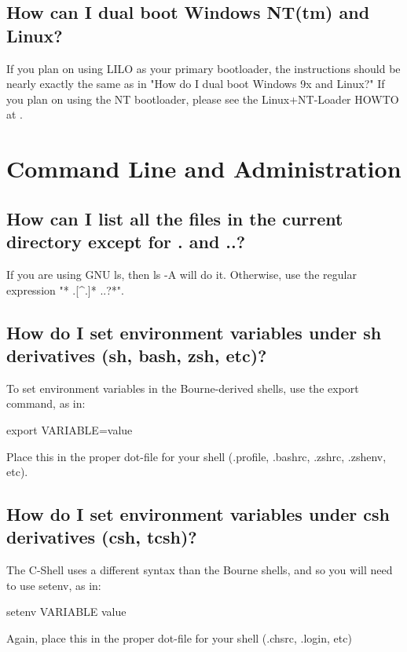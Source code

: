 \documentclass[a4paper]{article}
\begin{document}
\subsection{How can I dual boot Windows NT(tm) and Linux?}

If you plan on using LILO as your primary bootloader, the instructions
should be nearly exactly the  same as in "How do I dual boot Windows 9x
and Linux?"  If you plan on using the NT bootloader, please see the
Linux+NT-Loader HOWTO at .




\section{Command Line and Administration}


\subsection{How can I list all the files in the current directory except for . and ..?}

If you are using GNU ls, then ls -A will do it.  Otherwise, use the
regular expression "* .{[}\^{}.]* ..?*".




\subsection{How do I set environment variables under sh derivatives (sh, bash, zsh, etc)?}

To set environment variables in the Bourne-derived shells, use the
export command, as in:

export VARIABLE=value

Place this in the proper dot-file for your shell (.profile, .bashrc,
.zshrc, .zshenv, etc).




\subsection{How do I set environment variables under csh derivatives (csh, tcsh)?}

The C-Shell uses a different syntax than the Bourne shells, and so you
will need to use setenv, as in:

setenv VARIABLE value

Again, place this in the proper dot-file for your shell (.chsrc,
.login, etc)
\end{document}
